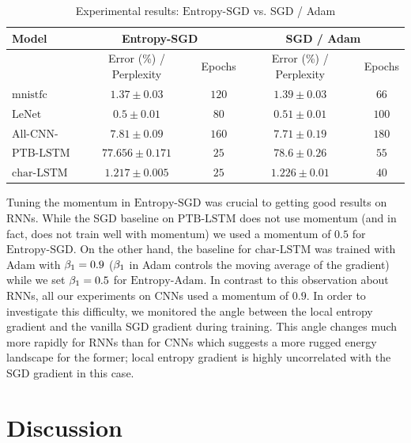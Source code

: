 \documentclass[10pt]{article}
\newcommand{\entropysgd}{\mathrm{Entropy}\textrm{-}\mathrm{SGD}}
\newcommand{\entropyadam}{\mathrm{Entropy}\textrm{-}\mathrm{Adam}}
\newcommand{\mnistfc}{\textrm{mnistfc}}
\newcommand{\charlstm}{\textrm{char-LSTM}}
\newcommand{\ptblstm}{\textrm{PTB-LSTM}}
\newcommand{\lenet}{\textrm{LeNet}}
\newcommand{\allcnn}{\textrm{All-CNN-BN}}
\begin{document}
{
\setlength{\heavyrulewidth}{1.5pt}
\renewcommand{\arraystretch}{1.4}
\begin{table}[H]
\centering
\resizebox{0.85 \columnwidth}{!}
{
\large
\begin{tabular}{p{4cm} | c c | c c}
\toprule
    \rowcolor{gray!15} Model & \multicolumn{2}{c}{Entropy-SGD} & \multicolumn{2}{c}{SGD / Adam}\\
\toprule
    & Error (\%) / Perplexity & Epochs & Error (\%) / Perplexity & Epochs\\[0.05in]
    \rowcolor{gray!15} $\mnistfc$ & $1.37 \pm 0.03$ & $120$ & $1.39 \pm 0.03$ & $66$\\
    $\lenet$ & $0.5 \pm 0.01$ & $80$ & $0.51 \pm 0.01$ & $100$\\
    \rowcolor{gray!15} $\allcnn$ & $7.81 \pm 0.09$ & $160$ & $7.71 \pm 0.19$ & $180$\\
    $\ptblstm$ & $77.656 \pm 0.171$ & $25$ & $78.6 \pm 0.26$ & $55$\\
    \rowcolor{gray!15} $\charlstm$ & $1.217 \pm 0.005$ & $25$ & $1.226 \pm 0.01$ & $40$\\
\bottomrule
\end{tabular}
}
\caption{\small Experimental results: $\entropysgd$ vs. SGD / Adam}
\label{tab:expts}
\end{table}
}

Tuning the momentum in $\entropysgd$ was crucial to getting good results on RNNs. While the SGD baseline on $\ptblstm$ does not use momentum (and in fact, does not train well with momentum) we used a momentum of $0.5$ for $\entropysgd$. On the other hand, the baseline for $\charlstm$ was trained with Adam with $\beta_1 = 0.9$ ($\beta_1$ in Adam controls the moving average of the gradient) while we set $\beta_1 = 0.5$ for $\entropyadam$. In contrast to this observation about RNNs, all our experiments on CNNs used a momentum of $0.9$. In order to investigate this difficulty, we monitored the angle between the local entropy gradient and the vanilla SGD gradient during training. This angle changes much more rapidly for RNNs than for CNNs which suggests a more rugged energy landscape for the former; local entropy gradient is highly uncorrelated with the SGD gradient in this case.

\section{Discussion}
\label{s:discussion}
\end{document}

